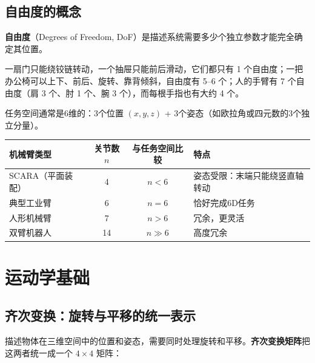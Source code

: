 \subsection{自由度的概念}

\textbf{自由度}（Degrees of Freedom, DoF）是描述系统需要多少个独立参数才能完全确定其位置。

\begin{example}[日常生活中的自由度]
一扇门只能绕铰链转动，一个抽屉只能前后滑动，它们都只有 1 个自由度；一把办公椅可以上下、前后、旋转、靠背倾斜，自由度有 5--6 个；人的手臂有 7 个自由度（肩 3 个、肘 1 个、腕 3 个），而每根手指也有大约 4 个。
\end{example}


任务空间通常是6维的：3个位置 $(x, y, z)$ + 3个姿态（如欧拉角或四元数的3个独立分量）。

\begin{center}
\renewcommand{\arraystretch}{1.3}
\small
\begin{tabularx}{\linewidth}{l|c|c|X}
\toprule
\textbf{机械臂类型} & \textbf{关节数 $n$} & \textbf{与任务空间比较} & \textbf{特点} \\
\midrule
SCARA（平面装配） & 4 & $n < 6$ & 姿态受限：末端只能绕竖直轴转动 \\
典型工业臂 & 6 & $n = 6$ & 恰好完成6D任务 \\
人形机械臂 & 7 & $n > 6$ & 冗余，更灵活 \\
双臂机器人 & 14 & $n \gg 6$ & 高度冗余 \\
\bottomrule
\end{tabularx}
\end{center}

\section{运动学基础}

\subsection{齐次变换：旋转与平移的统一表示}

描述物体在三维空间中的位置和姿态，需要同时处理旋转和平移。\textbf{齐次变换矩阵}把这两者统一成一个 $4 \times 4$ 矩阵：

